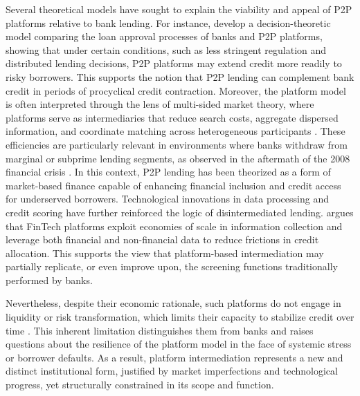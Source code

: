 \documentclass[pdflatex,sn-apa]{sn-jnl}%
\theoremstyle{thmstyleone}%
\theoremstyle{thmstyletwo}%
\theoremstyle{thmstylethree}%
\begin{document}
Several theoretical models have sought to explain the viability and appeal of P2P platforms relative to bank lending. For instance, \cite{Ben-Yashar2024939} develop a decision-theoretic model comparing the loan approval processes of banks and P2P platforms, showing that under certain conditions, such as less stringent regulation and distributed lending decisions, P2P platforms may extend credit more readily to risky borrowers. This supports the notion that P2P lending can complement bank credit in periods of procyclical credit contraction. Moreover, the platform model is often interpreted through the lens of multi-sided market theory, where platforms serve as intermediaries that reduce search costs, aggregate dispersed information, and coordinate matching across heterogeneous participants \citep{Berger200939}. These efficiencies are particularly relevant in environments where banks withdraw from marginal or subprime lending segments, as observed in the aftermath of the 2008 financial crisis \citep{Bavoso2020395}. In this context, P2P lending has been theorized as a form of market-based finance capable of enhancing financial inclusion and credit access for underserved borrowers. Technological innovations in data processing and credit scoring have further reinforced the logic of disintermediated lending. \cite{Georgiev2024587} argues that FinTech platforms exploit economies of scale in information collection and leverage both financial and non-financial data to reduce frictions in credit allocation. This supports the view that platform-based intermediation may partially replicate, or even improve upon, the screening functions traditionally performed by banks.

Nevertheless, despite their economic rationale, such platforms do not engage in liquidity or risk transformation, which limits their capacity to stabilize credit over time \citep{Havrylchyk2018115}. This inherent limitation distinguishes them from banks and raises questions about the resilience of the platform model in the face of systemic stress or borrower defaults. As a result, platform intermediation represents a new and distinct institutional form, justified by market imperfections and technological progress, yet structurally constrained in its scope and function.
\end{document}
